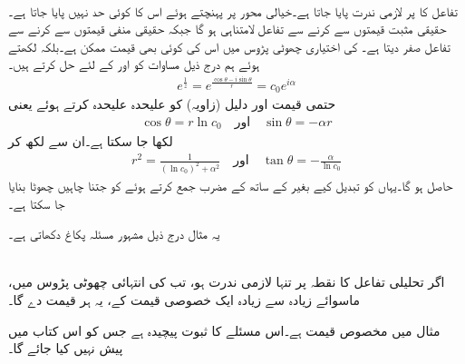 \quad {}\\
تفاعل  کا  پر لازمی ندرت پایا جاتا ہے۔خیالی محور پر پہنچتے ہوئے اس کا کوئی حد نہیں پایا جاتا ہے۔حقیقی مثبت قیمتوں سے  کرنے سے تفاعل لامتناہی ہو گا جبکہ حقیقی منفی قیمتوں سے   کرنے سے تفاعل صفر دیتا ہے۔ کی اختیاری چھوٹی پڑوس میں اس کی کوئی بھی قیمت  ممکن ہے۔بلکہ  لکھتے ہوئے ہم درج ذیل مساوات کو  اور  کے لئے  حل کرتے ہیں۔
\begin{align*}
e^{\frac{1}{z}}=e^{\frac{\cos \theta-i\sin\theta}{r}}=c_0e^{i\alpha}
\end{align*}
حتمی قیمت اور دلیل (زاویہ) کو علیحدہ علیحدہ کرتے ہوئے     یعنی
\begin{align*}
\cos \theta=r\ln c_0 \quad \text{اور}\quad \sin \theta=-\alpha r 
\end{align*}
لکھا جا سکتا ہے۔ان سے  لکھ کر 
\begin{align*}
r^2=\frac{1}{(\ln c_0)^2+\alpha^2}\quad \text{اور}\quad \tan \theta=-\frac{\alpha}{\ln c_0}
\end{align*}
حاصل ہو گا۔یہاں   کو تبدیل کیے بغیر  کے ساتھ  کے مضرب جمع کرتے ہوئے  کو جتنا چاہیں چھوٹا بنایا جا سکتا ہے۔

یہ مثال درج ذیل مشہور مسئلہ پکاغ  دکھاتی ہے۔

\quad {}  \\
اگر تحلیلی تفاعل  کا نقطہ  پر تنہا لازمی ندرت ہو، تب  کی انتہائی چھوٹی پڑوس میں، ماسوائے زیادہ سے زیادہ ایک خصوصی قیمت کے، یہ ہر قیمت دے گا۔

مثال  میں مخصوص قیمت  ہے۔اس مسئلے کا ثبوت پیچیدہ ہے جس کو اس کتاب میں پیش نہیں کیا جائے گا۔ 

